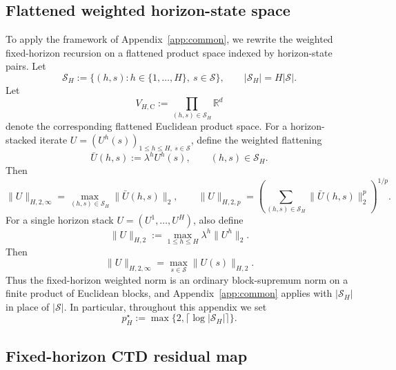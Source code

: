\documentclass{article}
\newcommand{\X}{\mathcal{S}}
\newcommand{\R}{\mathbb{R}}
\begin{document}
\subsection{Flattened weighted horizon-state space}

To apply the framework of Appendix~\ref{app:common}, we rewrite the weighted fixed-horizon recursion on a flattened product space indexed by horizon-state pairs. Let
\begin{equation}
\mathcal S_H := \{(h,s): h\in\{1,\dots,H\},\ s\in \X\}, \qquad \lvert \mathcal S_H \rvert = H\lvert \X \rvert.
\end{equation}
Let
\begin{equation}
V_{H, \mathrm C} := \prod_{(h, s) \in \mathcal S_H} \R^d
\end{equation}
denote the corresponding flattened Euclidean product space. For a horizon-stacked iterate $U=(U^h(s))_{1\le h\le H,\ s\in \X}$, define the weighted flattening
\begin{equation}
\bar{U}(h,s):=\lambda^h U^h(s), \qquad (h,s)\in\mathcal S_H.
\end{equation}
Then
\begin{equation}
\lVert U \rVert_{H,2,\infty} = \max_{(h,s)\in\mathcal S_H}\lVert \bar{U}(h,s) \rVert_2, \qquad \lVert U \rVert_{H,2,p} = \left( \sum_{(h,s)\in\mathcal S_H}\lVert \bar{U}(h,s) \rVert_2^p \right)^{1/p}.
\end{equation}
For a single horizon stack $U=(U^1,\dots,U^H)$, also define
\begin{equation}
\lVert U \rVert_{H,2} := \max_{1\le h\le H}\lambda^h\lVert U^h \rVert_2.
\end{equation}
Then
\begin{equation}
\lVert U \rVert_{H,2,\infty} = \max_{s\in \X}\lVert U(s) \rVert_{H,2}.
\end{equation}
Thus the fixed-horizon weighted norm is an ordinary block-supremum norm on a finite product of Euclidean blocks, and Appendix~\ref{app:common} applies with $\lvert \mathcal S_H \rvert$ in place of $\lvert \X \rvert$. In particular, throughout this appendix we set
\begin{equation}
p_H^\star := \max\{2,\lceil \log \lvert \mathcal S_H \rvert\rceil\}.
\end{equation}

\subsection{Fixed-horizon CTD residual map}
\end{document}
